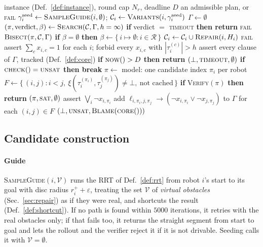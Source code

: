 \documentclass[conference]{IEEEtran}
\theoremstyle{plain}
\theoremstyle{definition}
\newcommand{\Rob}{\mathcal{R}}
\newcommand{\Cand}{\mathcal{C}}
\newcommand{\clr}{\varepsilon}
\begin{document}
\begin{algorithm}[t]
\caption{Core-guided coordination}
\label{alg:main}
\begin{algorithmic}[1]
\Require instance (Def.~\ref{def:instance}), round cap $N_r$, deadline $D$
\Ensure an admissible plan, or \textsc{fail}
\For{$i \in \Rob$}
  \State $\gamma_i^{\text{seed}} \gets \textsc{SampleGuide}(i, \emptyset)$;\quad
         $\Cand_i \gets \textsc{Variants}(i, \gamma_i^{\text{seed}})$
\EndFor
\State $\Gamma \gets \emptyset$ 
  \State $(\pi, \text{verdict}, \beta) \gets \textsc{Search}(\Cand, \Gamma, h=\infty)$
  \State \textbf{if} verdict $=$ \textsc{timeout} \textbf{then return} \textsc{fail}
    \State \Return $\textsc{Bisect}(\pi, \Cand, \Gamma)$
  \EndIf
  \State \textbf{if} $\beta = \emptyset$ \textbf{then} $\beta \gets \{\, i \mapsto \emptyset : i \in \Rob\,\}$
    \State $\Cand_i \gets \Cand_i \cup \textsc{Repair}(i, H_i)$ 
  \EndFor
\EndFor
\State \Return \textsc{fail}
\Statex
\Function{Search}{$\Cand, \Gamma, h$}
  \State assert $\sum_{c} x_{i,c} = 1$ for each $i$; forbid every $x_{i,c}$ with $|\tau_i^{(c)}| > h$
  \State assert every clause of $\Gamma$, tracked (Def.~\ref{def:core})
    \State \textbf{if} $\textsc{now}() > D$ \textbf{then return} $(\bot, \textsc{timeout}, \emptyset)$
    \State \textbf{if} $\textsc{check}() = \textsc{unsat}$ \textbf{then break}
    \State $\pi \gets$ model: one candidate index $\pi_i$ per robot
    \State $F \gets \{\,(i,j) : i<j,\ \xi(\tau_i^{(\pi_i)}, \tau_j^{(\pi_j)}) \neq \bot,\ \text{not cached}\,\}$
      \State \textbf{if} \textsc{Verify}$(\pi)$ \textbf{then return} $(\pi,\textsc{sat},\emptyset)$
      \State assert $\bigvee_i \neg x_{i,\pi_i}$ 
    \Else
      \State add $\ell_{i,\pi_i,j,\pi_j} \rightarrow (\neg x_{i,\pi_i} \vee \neg x_{j,\pi_j})$ to $\Gamma$
             for each $(i,j) \in F$
    \EndIf
  \EndWhile
  \State \Return $(\bot, \textsc{unsat}, \textsc{Blame}(\textsc{core}()))$
\EndFunction
\end{algorithmic}
\end{algorithm}

\subsection{Candidate construction}
\label{sec:candidates}

\paragraph*{Guide}
\textsc{SampleGuide}$(i, \mathcal{V})$ runs the RRT of Def.~\ref{def:rrt} from robot $i$'s
start to its goal with disc radius $r^{+}_i + \clr$, treating the set $\mathcal{V}$ of
\emph{virtual obstacles} (Sec.~\ref{sec:repair}) as if they were real, and shortcuts the
result (Def.~\ref{def:shortcut}). If no path is found within $5000$ iterations, it retries
with the real obstacles only; if that fails too, it returns the straight segment from start
to goal and lets the rollout and the verifier reject it if it is not drivable. Seeding calls
it with $\mathcal{V} = \emptyset$.
\end{document}
